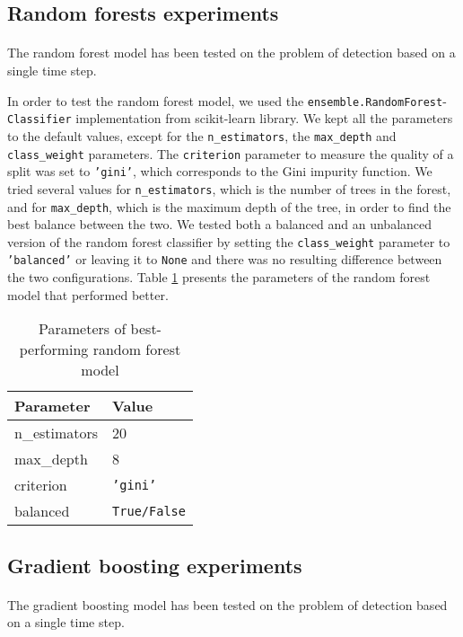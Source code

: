 \subsection{Random forests experiments}
\paragraph{} The random forest model has been tested on the problem of detection based on a single time step.

In order to test the random forest model, we used the \texttt{ensemble.RandomForest}-\texttt{Classifier} implementation from scikit-learn library. We kept all the parameters to the default values, except for the \texttt{n\_estimators}, the \texttt{max\_depth} and \texttt{class\_weight} parameters. The \texttt{criterion} parameter to measure the quality of a split was set to \texttt{'gini'}, which corresponds to the Gini impurity function. We tried several values for \texttt{n\_estimators}, which is the number of trees in the forest, and for \texttt{max\_depth}, which is the maximum depth of the tree, in order to find the best balance between the two. We tested both a balanced and an unbalanced version of the random forest classifier by setting the \texttt{class\_weight} parameter to \texttt{'balanced'} or leaving it to \texttt{None} and there was no resulting difference between the two configurations. Table \ref{tab:randomforest_param} presents the parameters of the random forest model that performed better.
\begin{table}[htbp]
    \centering
    \begin{tabular}{ll}
        \hline
        \textbf{Parameter}  & \textbf{Value} \\\hline
        n\_estimators       & 20 \\
        max\_depth          & 8 \\
        criterion           & \texttt{'gini'} \\
        balanced            & \texttt{True/False} \\\hline
    \end{tabular}
    \caption{Parameters of best-performing random forest model}
    \label{tab:randomforest_param}
\end{table}

\subsection{Gradient boosting experiments}
\paragraph{} The gradient boosting model has been tested on the problem of detection based on a single time step.

